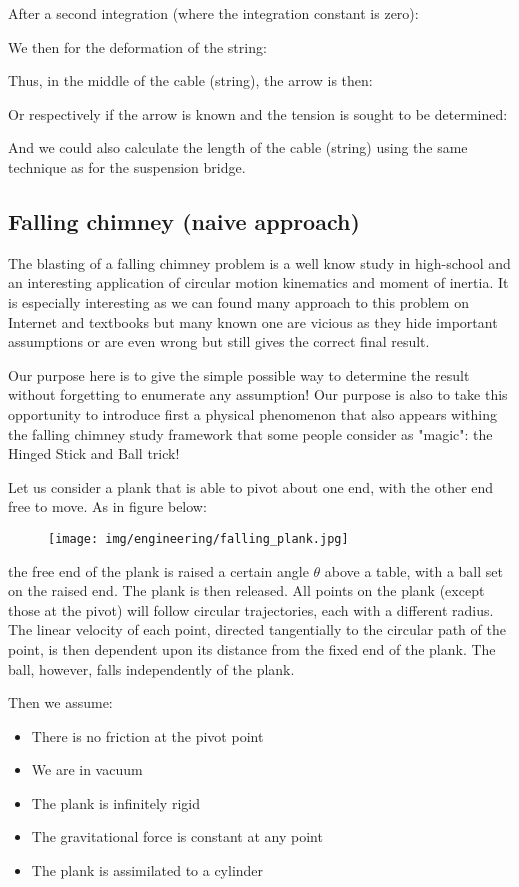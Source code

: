 	After a second integration (where the integration constant is zero):
	
	We then for the deformation of the string:
	
	Thus, in the middle of the cable (string), the arrow is then:
	
	Or respectively if the arrow is known and the tension is sought to be determined:
	
	And we could also calculate the length of the cable (string) using the same technique as for the suspension bridge.
	
	\pagebreak
	\subsection{Falling chimney (naive approach)}
	The blasting of a falling chimney problem is a well know study in high-school and an interesting application of circular motion kinematics and moment of inertia. It is especially interesting as we can found many approach to this problem on Internet and textbooks but many known one are vicious as they hide important assumptions or are even wrong but still gives the correct final result.
	
	Our purpose here is to give the simple possible way to determine the result without forgetting to enumerate any assumption! Our purpose is also to take this opportunity to introduce first a physical phenomenon that also appears withing the falling chimney study framework that some people consider as "magic": the Hinged Stick and Ball trick!
	
	Let us consider a plank that is able to pivot about one end, with the other end free to move. As in figure below:
	\begin{figure}[H]
		\centering
		\texttt{[image: img/engineering/falling\_plank.jpg]}
	\end{figure}
	 the free end of the plank is raised a certain angle $\theta$ above a table, with a ball set on the raised end. The plank is then released. All points on the plank (except those at the pivot) will follow circular trajectories, each with a different radius. The linear velocity of each point, directed tangentially to the circular path of the point, is then dependent upon its distance from the fixed end of the plank. The ball, however, falls independently of the plank.
	 
	Then we assume:
	\begin{itemize}
		\item There is no friction at the pivot point
		\item We are in vacuum
		\item The plank is infinitely rigid
		\item The gravitational force is constant at any point
		\item The plank is assimilated to a cylinder
	\end{itemize}


